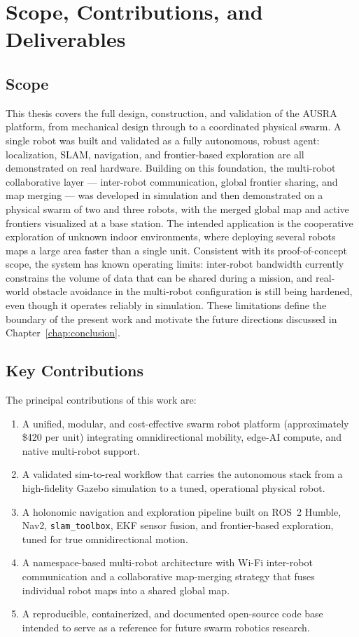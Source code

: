 \section{Scope, Contributions, and Deliverables}
\label{sec:scope_contributions}

\subsection{Scope}
This thesis covers the full design, construction, and validation of the AUSRA platform, from mechanical design through to a coordinated physical swarm. A single robot was built and validated as a fully autonomous, robust agent: localization, SLAM, navigation, and frontier-based exploration are all demonstrated on real hardware. Building on this foundation, the multi-robot collaborative layer --- inter-robot communication, global frontier sharing, and map merging --- was developed in simulation and then demonstrated on a physical swarm of two and three robots, with the merged global map and active frontiers visualized at a base station. The intended application is the cooperative exploration of unknown indoor environments, where deploying several robots maps a large area faster than a single unit. Consistent with its proof-of-concept scope, the system has known operating limits: inter-robot bandwidth currently constrains the volume of data that can be shared during a mission, and real-world obstacle avoidance in the multi-robot configuration is still being hardened, even though it operates reliably in simulation. These limitations define the boundary of the present work and motivate the future directions discussed in Chapter~\ref{chap:conclusion}.

\subsection{Key Contributions}
The principal contributions of this work are:
\begin{enumerate}
    \item A unified, modular, and cost-effective swarm robot platform (approximately \$420 per unit) integrating omnidirectional mobility, edge-AI compute, and native multi-robot support.
    \item A validated sim-to-real workflow that carries the autonomous stack from a high-fidelity Gazebo simulation to a tuned, operational physical robot.
    \item A holonomic navigation and exploration pipeline built on ROS~2 Humble, Nav2, \texttt{slam\_toolbox}, EKF sensor fusion, and frontier-based exploration, tuned for true omnidirectional motion.
    \item A namespace-based multi-robot architecture with Wi-Fi inter-robot communication and a collaborative map-merging strategy that fuses individual robot maps into a shared global map.
    \item A reproducible, containerized, and documented open-source code base intended to serve as a reference for future swarm robotics research.
\end{enumerate}

